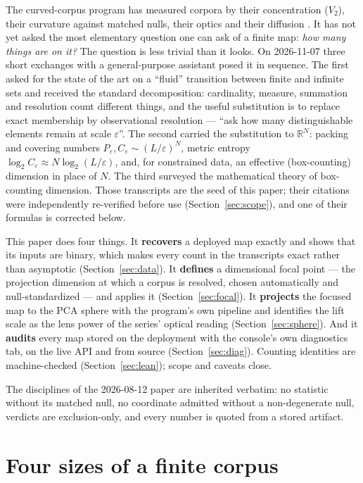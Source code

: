\documentclass[11pt,a4paper]{article}
\theoremstyle{plain}
\theoremstyle{remark}
\begin{document}
The curved-corpus program has measured corpora by their concentration ($V_2$), their curvature against matched nulls, their optics and their diffusion \citep{tch2026latent,tch2026isthisx,tch2026unified}. It has not yet asked the most elementary question one can ask of a finite map: \emph{how many things are on it?} The question is less trivial than it looks. On 2026-11-07 three short exchanges with a general-purpose assistant posed it in sequence. The first asked for the state of the art on a ``fluid'' transition between finite and infinite sets and received the standard decomposition: cardinality, measure, summation and resolution count different things, and the useful substitution is to replace exact membership by observational resolution --- ``ask how many distinguishable elements remain at scale $\varepsilon$''. The second carried the substitution to $\mathbb{R}^N$: packing and covering numbers $P_\varepsilon,C_\varepsilon\sim(L/\varepsilon)^N$, metric entropy $\log_2 C_\varepsilon\approx N\log_2(L/\varepsilon)$, and, for constrained data, an effective (box-counting) dimension in place of $N$. The third surveyed the mathematical theory of box-counting dimension. Those transcripts are the seed of this paper; their citations were independently re-verified before use (Section~\ref{sec:scope}), and one of their formulas is corrected below.

This paper does four things. It \textbf{recovers} a deployed map exactly and shows that its inputs are binary, which makes every count in the transcripts exact rather than asymptotic (Section~\ref{sec:data}). It \textbf{defines} a dimensional focal point --- the projection dimension at which a corpus is resolved, chosen automatically and null-standardized --- and applies it (Section~\ref{sec:focal}). It \textbf{projects} the focused map to the PCA sphere with the program's own pipeline and identifies the lift scale as the lens power of the series' optical reading (Section~\ref{sec:sphere}). And it \textbf{audits} every map stored on the deployment with the console's own diagnostics tab, on the live API and from source (Section~\ref{sec:diag}). Counting identities are machine-checked (Section~\ref{sec:lean}); scope and caveats close.

The disciplines of the 2026-08-12 paper \citep{tch2026isthisx} are inherited verbatim: no statistic without its matched null, no coordinate admitted without a non-degenerate null, verdicts are exclusion-only, and every number is quoted from a stored artifact.

\section{Four sizes of a finite corpus}
\label{sec:sizes}
\end{document}
